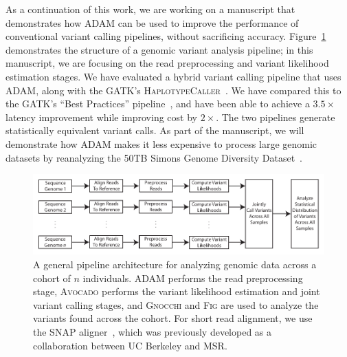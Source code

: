 \documentclass[11pt]{article} %
\begin{document}
As a continuation of this work, we are working on a manuscript that demonstrates how \textsc{ADAM}
can be used to improve the performance of conventional variant calling pipelines, without
sacrificing accuracy. Figure~\ref{fig:pipeline} demonstrates the structure of a genomic variant
analysis pipeline; in this manuscript, we are focusing on the read preprocessing and variant
likelihood estimation stages. We have evaluated a hybrid variant calling pipeline that
uses \textsc{ADAM}, along with the \textsc{GATK}'s \textsc{HaplotypeCaller}~\cite{depristo11}. We
have compared this to the \textsc{GATK}'s ``Best Practices'' pipeline~\cite{auwera13}, and have
been able to achieve a $3.5\times$ latency improvement while improving cost by $2\times$. The
two pipelines generate statistically equivalent variant calls. As part of the manuscript, we
will demonstrate how \textsc{ADAM} makes it less expensive to process large genomic datasets
by reanalyzing the 50TB Simons Genome Diversity Dataset~\cite{simons}.

\begin{figure}[h]
\begin{center}
\includegraphics[width=0.85\linewidth]{pipeline.pdf}
\caption{A general pipeline architecture for analyzing genomic data across a cohort of
$n$ individuals. \textsc{ADAM} performs the read preprocessing stage, \textsc{Avocado}
performs the variant likelihood estimation and joint variant calling stages, and
\textsc{Gnocchi} and \textsc{Fig} are used to analyze the variants found across the cohort.
For short read alignment, we use the \textsc{SNAP} aligner~\cite{zaharia11}, which was
previously developed as a collaboration between UC Berkeley and MSR.}
\label{fig:pipeline}
\end{center}
\end{figure}
\end{document}
